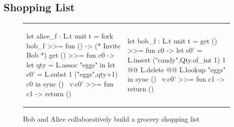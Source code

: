 \subsection{Shopping List}

\begin{figure}
\centering
\begin{tabular}{l||l}
\begin{ocaml}
let alice_f : L.t unit t =
  fork bob_f >>= fun () -> (* Invite Bob *)
  get () >>= fun c0 ->
  let qty = L.assoc "eggs" in
  let c0' = L.subst 1 ("eggs",qty+1) c0 in
  sync () ~v:c0' >>=
  fun c1 -> return ()
\end{ocaml}
&
\begin{ocaml}
let bob_f : L.t unit t =
  get () >>= fun c0 ->
  let c0' = L.insert ("candy",Qty.of_int 1) 1 @@ 
            L.delete @@ L.lookup "eggs" in
  sync () ~v:c0' >>=
  fun c1 -> return ()
\end{ocaml}
\\
\end{tabular}
\caption{Bob and Alice collaboratively build a grocery shopping list}
\label{fig:shopping-list-code}
\end{figure}

